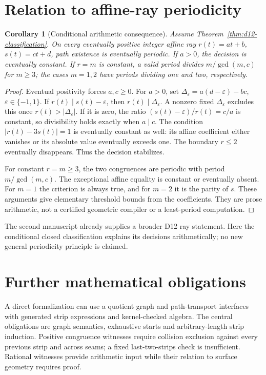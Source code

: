 \documentclass[11pt]{amsart}
\newcommand{\claimid}[1]{}
\newtheorem{corollary}[theorem]{Corollary}
\theoremstyle{definition}\newtheorem{definition}[theorem]{Definition}
\begin{document}
\section{Relation to affine-ray periodicity}\label{cor:d12-rays}
\begin{corollary}[Conditional arithmetic consequence]
Assume Theorem~\ref{thm:d12-classification}. On every eventually positive
integer affine ray $r(t)=at+b$, $s(t)=ct+d$, path existence is eventually
periodic. If $a>0$, the decision is eventually constant. If $r=m$ is
constant, a valid period divides $m/\gcd(m,c)$ for $m\ge3$; the cases
$m=1,2$ have periods dividing one and two, respectively.
\end{corollary}
\claimid{cor:d12-rays}
\begin{proof}
Eventual positivity forces $a,c\ge0$. For $a>0$, set
$\Delta_\varepsilon=a(d-\varepsilon)-bc$, $\varepsilon\in\{-1,1\}$.
If $r(t)\mid s(t)-\varepsilon$, then $r(t)\mid\Delta_\varepsilon$.
A nonzero fixed $\Delta_\varepsilon$ excludes this once
$r(t)>|\Delta_\varepsilon|$. If it is zero, the ratio
$(s(t)-\varepsilon)/r(t)=c/a$ is constant, so divisibility holds
exactly when $a\mid c$. The condition $|r(t)-3s(t)|=1$ is eventually
constant as well: its affine coefficient either vanishes or its
absolute value eventually exceeds one. The boundary $r\le2$ eventually
disappears. Thus the decision stabilizes.

For constant $r=m\ge3$, the two congruences are periodic with period
$m/\gcd(m,c)$. The exceptional affine equality is constant or eventually
absent. For $m=1$ the criterion is always true, and for $m=2$ it is the
parity of $s$. These arguments give elementary threshold bounds from
the coefficients. They are prose arithmetic, not a certified geometric
compiler or a least-period computation.
\end{proof}
The second manuscript already supplies a broader D12 ray statement.
Here the conditional closed classification explains its decisions
arithmetically; no new general periodicity principle is claimed.

\section{Further mathematical obligations}
A direct formalization can use a quotient graph and path-transport
interfaces with generated strip expressions and kernel-checked algebra.
The central obligations are graph semantics, exhaustive starts and
arbitrary-length strip induction. Positive congruence witnesses require
collision exclusion against every previous strip and across seams;
a fixed last-two-strips check is insufficient. Rational witnesses
provide arithmetic input while their relation to surface geometry
requires proof.
\end{document}
